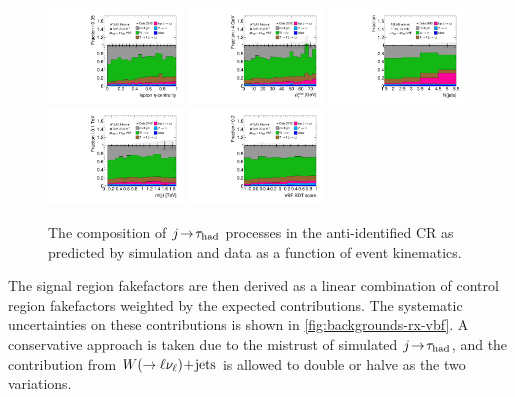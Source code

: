 \begin{figure}[tp]
  \includegraphics[width=0.32\textwidth]{figures/rx/vbf-mvaSR/lep-eta-centrality}
  \includegraphics[width=0.32\textwidth]{figures/rx/vbf-mvaSR/system-pt}
  \includegraphics[width=0.32\textwidth]{figures/rx/vbf-mvaSR/n-jets30}
  \includegraphics[width=0.32\textwidth]{figures/rx/vbf-mvaSR/dijet-m-veryhigh}
  \includegraphics[width=0.32\textwidth]{figures/rx/vbf-mvaSR/BDTEve-VBF}
  \caption{The composition of $j\!\rightarrow\!\tau_\text{had}$ processes in the anti-identified CR as predicted by simulation and data as a function of event kinematics.}
  \label{fig:backgrounds-rx-vbf-jets}
\end{figure}

The signal region fakefactors are then derived as a linear combination of control region fakefactors weighted by the expected contributions. The systematic uncertainties on these contributions is shown in \cref{fig:backgrounds-rx-vbf}. A conservative approach is taken due to the mistrust of simulated $j\!\rightarrow\!\tau_\text{had}$, and the contribution from $W (\rightarrow \ell\nu_\ell)\!+\!\text{jets}$ is allowed to double or halve as the two variations.


